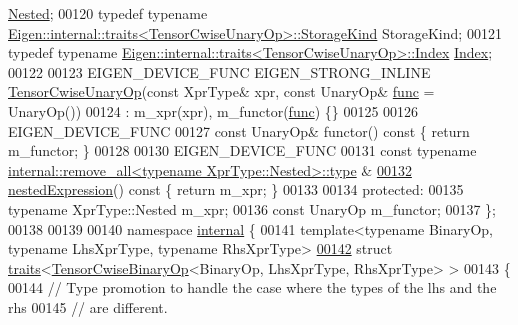 \begin{DoxyCode}
       \hyperlink{class_eigen_1_1internal_1_1_tensor_lazy_evaluator_writable}{Nested};
00120     \textcolor{keyword}{typedef} \textcolor{keyword}{typename} \hyperlink{struct_eigen_1_1internal_1_1traits}{Eigen::internal::traits<TensorCwiseUnaryOp>::StorageKind}
       StorageKind;
00121     \textcolor{keyword}{typedef} \textcolor{keyword}{typename} \hyperlink{struct_eigen_1_1internal_1_1traits}{Eigen::internal::traits<TensorCwiseUnaryOp>::Index}
       \hyperlink{namespace_eigen_a62e77e0933482dafde8fe197d9a2cfde}{Index};
00122 
00123     EIGEN\_DEVICE\_FUNC EIGEN\_STRONG\_INLINE \hyperlink{class_eigen_1_1_tensor_cwise_unary_op}{TensorCwiseUnaryOp}(\textcolor{keyword}{const} XprType& xpr, \textcolor{keyword}{const} 
      UnaryOp& \hyperlink{structfunc}{func} = UnaryOp())
00124       : m\_xpr(xpr), m\_functor(\hyperlink{structfunc}{func}) \{\}
00125 
00126     EIGEN\_DEVICE\_FUNC
00127     \textcolor{keyword}{const} UnaryOp& functor()\textcolor{keyword}{ const }\{ \textcolor{keywordflow}{return} m\_functor; \}
00128 
00130     EIGEN\_DEVICE\_FUNC
00131     \textcolor{keyword}{const} \textcolor{keyword}{typename} \hyperlink{group___sparse_core___module}{internal::remove\_all<typename XprType::Nested>::type}
      &
\hyperlink{class_eigen_1_1_tensor_cwise_unary_op_af3a260b2117072817e641d72038cce51}{00132}     \hyperlink{class_eigen_1_1_tensor_cwise_unary_op_af3a260b2117072817e641d72038cce51}{nestedExpression}()\textcolor{keyword}{ const }\{ \textcolor{keywordflow}{return} m\_xpr; \}
00133 
00134   \textcolor{keyword}{protected}:
00135     \textcolor{keyword}{typename} XprType::Nested m\_xpr;
00136     \textcolor{keyword}{const} UnaryOp m\_functor;
00137 \};
00138 
00139 
00140 \textcolor{keyword}{namespace }\hyperlink{namespaceinternal}{internal} \{
00141 \textcolor{keyword}{template}<\textcolor{keyword}{typename} BinaryOp, \textcolor{keyword}{typename} LhsXprType, \textcolor{keyword}{typename} RhsXprType>
\hyperlink{struct_eigen_1_1internal_1_1traits_3_01_tensor_cwise_binary_op_3_01_binary_op_00_01_lhs_xpr_type_00_01_rhs_xpr_type_01_4_01_4}{00142} \textcolor{keyword}{struct }\hyperlink{struct_eigen_1_1internal_1_1traits}{traits}<\hyperlink{class_eigen_1_1_tensor_cwise_binary_op}{TensorCwiseBinaryOp}<BinaryOp, LhsXprType, RhsXprType> >
00143 \{
00144   \textcolor{comment}{// Type promotion to handle the case where the types of the lhs and the rhs}
00145   \textcolor{comment}{// are different.}

\end{DoxyCode}
